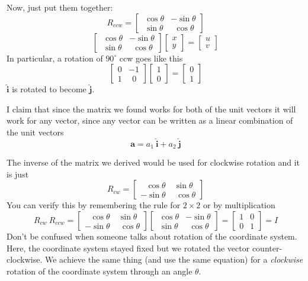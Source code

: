 \documentclass[11pt, oneside]{article}   	%
\begin{document}
Now, just put them together:
\[
R_{ccw} = 
\begin{bmatrix}   \ \cos \theta & -\sin \theta  \\  \ \sin \theta & \ \ \cos \theta  \end{bmatrix}
\]
\[
\begin{bmatrix}   \ \cos \theta & -\sin \theta  \\  \ \sin \theta & \ \ \cos \theta  \end{bmatrix}
\begin{bmatrix}   x   \\  y  \end{bmatrix} = \begin{bmatrix}   u   \\  v  \end{bmatrix}
\]
In particular, a rotation of $90^{\circ}$ ccw goes like this
\[
\begin{bmatrix}   0 & -1  \\  1 & \ \ 0  \end{bmatrix}
\begin{bmatrix}   1   \\  0  \end{bmatrix} = \begin{bmatrix}   0   \\  1  \end{bmatrix}
\]
$\hat{\mathbf{i}}$ is rotated to become $\hat{\mathbf{j}}$.

I claim that since the matrix we found works for both of the unit vectors it will work for any vector, since any vector can be written as a linear combination of the unit vectors
\[ \mathbf{a} = a_1 \ \hat{\mathbf{i}} + a_2 \ \hat{\mathbf{j}} \]

The inverse of the matrix we derived would be used for clockwise rotation and it is just
\[
R_{cw} =
\begin{bmatrix}   \ \ \ \cos \theta & \ \sin \theta  \\  -\sin \theta & \ \ \cos \theta  \end{bmatrix}
\]
You can verify this by remembering the rule for $2 \times 2$ or by multiplication
\[
R_{cw} \  R_{ccw} =
\begin{bmatrix}   \ \ \ \cos \theta & \ \sin \theta  \\  -\sin \theta & \ \ \cos \theta  \end{bmatrix}
\begin{bmatrix}   \ \cos \theta & -\sin \theta  \\  \ \sin \theta & \ \ \cos \theta  \end{bmatrix}
= 
\begin{bmatrix}   1 & 0  \\  0 & 1 \end{bmatrix}
= I
\]
Don't be confused when someone talks about rotation of the coordinate system.  Here, the coordinate system stayed fixed but we rotated the vector counter-clockwise.  We achieve the same thing (and use the same equation) for a \emph{clockwise} rotation of the coordinate system through an angle $\theta$.
\end{document}
